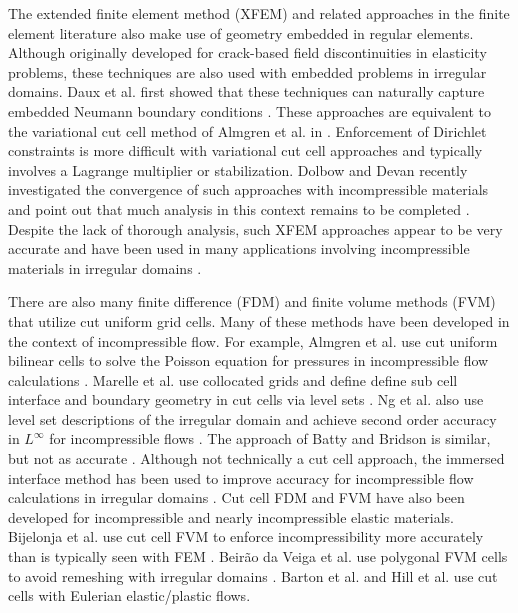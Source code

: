 The extended finite element method (XFEM) and related approaches in the finite element literature also make use of geometry embedded in regular elements. Although originally developed for crack-based field discontinuities in elasticity problems, these techniques are also used with embedded problems in irregular domains. Daux et al. first showed that these techniques can naturally capture embedded Neumann boundary conditions \cite{daux2000arbitrary,sukumar2001modeling}. These approaches are equivalent to the variational cut cell method of Almgren et al. in \cite{almgren1997}. Enforcement of Dirichlet constraints is more difficult with variational cut cell approaches \cite{moes2006imposing,lew2008discontinuous} and typically involves a Lagrange multiplier or stabilization. Dolbow and Devan recently investigated the convergence of such approaches with incompressible materials and point out that much analysis in this context remains to be completed \cite{dolbow2004enrichment}. Despite the lack of thorough analysis, such XFEM approaches appear to be very accurate and have been used in many applications involving incompressible materials in irregular domains \cite{wagner2001extended, becker2009nitsche, coppola2005improving, chessa2003extended, gerstenberger2008extended}.

There are also many finite difference (FDM) and finite volume methods (FVM) that utilize cut uniform grid cells. Many of these methods have been developed in the context of incompressible flow. For example, Almgren et al. use cut uniform bilinear cells to solve the Poisson equation for pressures in incompressible flow calculations \cite{almgren1997}. Marelle et al. use collocated grids and define define sub cell interface and boundary geometry in cut cells via level sets \cite{marella2005sharp}. Ng et al. also use level set descriptions of the irregular domain and achieve second order accuracy in $L^\infty$ for incompressible flows \cite{ng2009efficient}. The approach of Batty and Bridson is similar, but not as accurate \cite{Batty2007}. Although not technically a cut cell approach, the immersed interface method has been used to improve accuracy for incompressible flow calculations in irregular domains \cite{wiegmann2000explicit,rutka2008staggered,li2006nonslip,chen2008fast,xu2008immersed,rutka2004fast}. Cut cell FDM and FVM have also been developed for incompressible and nearly incompressible elastic materials. Bijelonja et al. use cut cell FVM to enforce incompressibility more accurately than is typically seen with FEM \cite{bijelonja2006finite}. Beir\~{a}o da Veiga et al. use polygonal FVM cells to avoid remeshing with irregular domains \cite{beirao2009mimetic}. Barton et al. \cite{barton2010eulerian} and Hill et al. \cite{hill2010eulerian} use cut cells with Eulerian elastic/plastic flows. 

